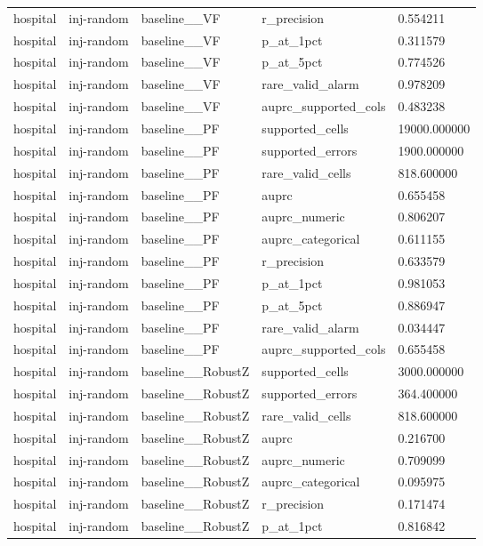 \begin{tabular}{lllll}
hospital & inj-random & baseline\_\_VF & r\_precision & 0.554211 \\
hospital & inj-random & baseline\_\_VF & p\_at\_1pct & 0.311579 \\
hospital & inj-random & baseline\_\_VF & p\_at\_5pct & 0.774526 \\
hospital & inj-random & baseline\_\_VF & rare\_valid\_alarm & 0.978209 \\
hospital & inj-random & baseline\_\_VF & auprc\_supported\_cols & 0.483238 \\
hospital & inj-random & baseline\_\_PF & supported\_cells & 19000.000000 \\
hospital & inj-random & baseline\_\_PF & supported\_errors & 1900.000000 \\
hospital & inj-random & baseline\_\_PF & rare\_valid\_cells & 818.600000 \\
hospital & inj-random & baseline\_\_PF & auprc & 0.655458 \\
hospital & inj-random & baseline\_\_PF & auprc\_numeric & 0.806207 \\
hospital & inj-random & baseline\_\_PF & auprc\_categorical & 0.611155 \\
hospital & inj-random & baseline\_\_PF & r\_precision & 0.633579 \\
hospital & inj-random & baseline\_\_PF & p\_at\_1pct & 0.981053 \\
hospital & inj-random & baseline\_\_PF & p\_at\_5pct & 0.886947 \\
hospital & inj-random & baseline\_\_PF & rare\_valid\_alarm & 0.034447 \\
hospital & inj-random & baseline\_\_PF & auprc\_supported\_cols & 0.655458 \\
hospital & inj-random & baseline\_\_RobustZ & supported\_cells & 3000.000000 \\
hospital & inj-random & baseline\_\_RobustZ & supported\_errors & 364.400000 \\
hospital & inj-random & baseline\_\_RobustZ & rare\_valid\_cells & 818.600000 \\
hospital & inj-random & baseline\_\_RobustZ & auprc & 0.216700 \\
hospital & inj-random & baseline\_\_RobustZ & auprc\_numeric & 0.709099 \\
hospital & inj-random & baseline\_\_RobustZ & auprc\_categorical & 0.095975 \\
hospital & inj-random & baseline\_\_RobustZ & r\_precision & 0.171474 \\
hospital & inj-random & baseline\_\_RobustZ & p\_at\_1pct & 0.816842 \\

\end{tabular}
